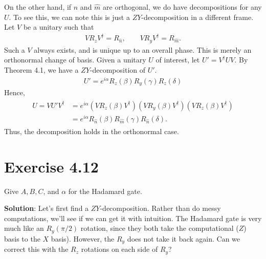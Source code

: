 \documentclass{book}
\begin{document}
    On the other hand, if $\hat{n}$ and $\hat{m}$ are orthogonal, we do have decompositions for any $U$. To see this, we can note this is just a $ZY$-decomposition in a different frame. Let $V$ be a unitary such that 
    \begin{align}
        V R_z V^\dagger = R_{\hat{n}}, \qquad V R_y V^\dagger = R_{\hat{m}}.
    \end{align}
    Such a $V$ always exists, and is unique up to an overall phase. This is merely an orthonormal change of basis. Given a unitary $U$ of interest, let $U' = V^\dagger U V$. By Theorem 4.1, we have a $ZY$-decomposition of $U'$.
    \begin{align}
        U' = e^{i\alpha} R_z(\beta) R_y(\gamma) R_z(\delta)
    \end{align}
    Hence,
    \begin{align}
    \begin{aligned}
        U = V U' V^\dagger &= e^{i\alpha} \left(V R_{z}(\beta)V^\dagger\right) \left(V R_y(\beta)V^\dagger\right) \left(V R_{z}(\beta)V^\dagger\right) \\
        &= e^{i\alpha} R_{\hat{n}}(\beta) R_{\hat{m}}(\gamma) R_{\hat{n}}(\delta).
    \end{aligned}
    \end{align}
    Thus, the decomposition holds in the orthonormal case.

\section*{Exercise 4.12}
    Give $A, B, C$, and $\alpha$ for the Hadamard gate.

    \textbf{Solution}: Let's first find a $ZY$-decomposition. Rather than do messy computations, we'll see if we can get it with intuition. The Hadamard gate is very much like an $R_y(\pi/2)$ rotation, since they both take the computational ($Z$) basis to the $X$ basis). However, the $R_y$ does not take it back again. Can we correct this with the $R_z$ rotations on each side of $R_y$?
\end{document}
